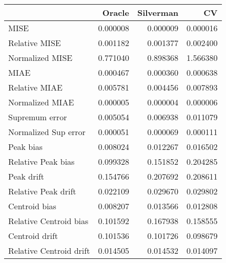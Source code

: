 \begin{tabular}{lrrr}
  \toprule
 & Oracle & Silverman & CV \\ 
  \midrule
MISE & 0.000008 & 0.000009 & 0.000016 \\ 
  Relative MISE & 0.001182 & 0.001377 & 0.002400 \\ 
  Normalized MISE & 0.771040 & 0.898368 & 1.566380 \\ 
  MIAE & 0.000467 & 0.000360 & 0.000638 \\ 
  Relative MIAE & 0.005781 & 0.004456 & 0.007893 \\ 
  Normalized MIAE & 0.000005 & 0.000004 & 0.000006 \\ 
  Supremum error & 0.005054 & 0.006938 & 0.011079 \\ 
  Normalized Sup error & 0.000051 & 0.000069 & 0.000111 \\ 
  Peak bias & 0.008024 & 0.012267 & 0.016502 \\ 
  Relative Peak bias & 0.099328 & 0.151852 & 0.204285 \\ 
  Peak drift & 0.154766 & 0.207692 & 0.208611 \\ 
  Relative Peak drift & 0.022109 & 0.029670 & 0.029802 \\ 
  Centroid bias & 0.008207 & 0.013566 & 0.012808 \\ 
  Relative Centroid bias & 0.101592 & 0.167938 & 0.158555 \\ 
  Centroid drift & 0.101536 & 0.101726 & 0.098679 \\ 
  Relative Centroid drift & 0.014505 & 0.014532 & 0.014097 \\ 
   \bottomrule
\end{tabular}
